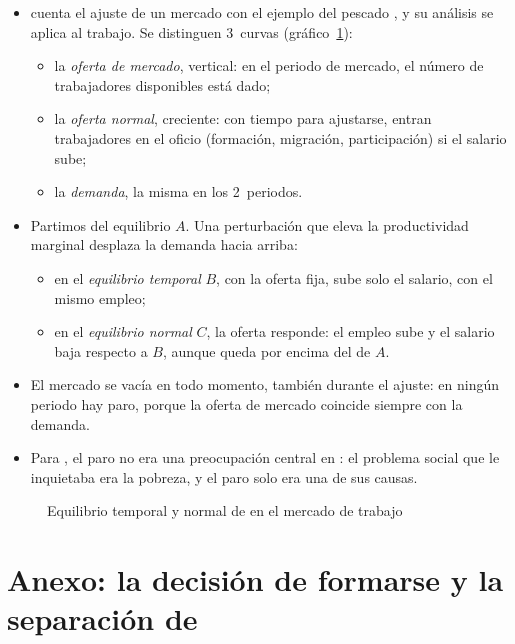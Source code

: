 \documentclass[11pt]{article}
\begin{document}
\begin{itemize}
\item \textcite{Marshall1890Principles} cuenta el ajuste de un mercado con el ejemplo del pescado , y su análisis se aplica al trabajo\nocite{DeVroey2016History}. Se distinguen 3~curvas (gráfico~\ref{fig:marshall-trabajo}):
  \begin{itemize}
  \item la \emph{oferta de mercado}, vertical: en el periodo de mercado, el número de trabajadores disponibles está dado;
  \item la \emph{oferta normal}, creciente: con tiempo para ajustarse, entran trabajadores en el oficio (formación, migración, participación) si el salario sube;
  \item la \emph{demanda}, la misma en los 2~periodos.
  \end{itemize}
\item Partimos del equilibrio $A$. Una perturbación que eleva la productividad marginal desplaza la demanda hacia arriba:
  \begin{itemize}
  \item en el \emph{equilibrio temporal} $B$, con la oferta fija, sube solo el salario, con el mismo empleo;
  \item en el \emph{equilibrio normal} $C$, la oferta responde: el empleo sube y el salario baja respecto a $B$, aunque queda por encima del de $A$.
  \end{itemize}
\item El mercado se vacía en todo momento, también durante el ajuste: en ningún periodo hay paro, porque la oferta de mercado coincide siempre con la demanda.
\item Para \textcite{Matthews1990Marshall}, el paro no era una preocupación central en : el problema social que le inquietaba era la pobreza, y el paro solo era una de sus causas.
\end{itemize}

\begin{figure}[H]
\centering
\caption{Equilibrio temporal y normal de  en el mercado de trabajo}\label{fig:marshall-trabajo}
\end{figure}

\section{Anexo: la decisión de formarse\cortetitulo{} y la separación de }\label{anexo:fisher-capital-humano}
\end{document}
